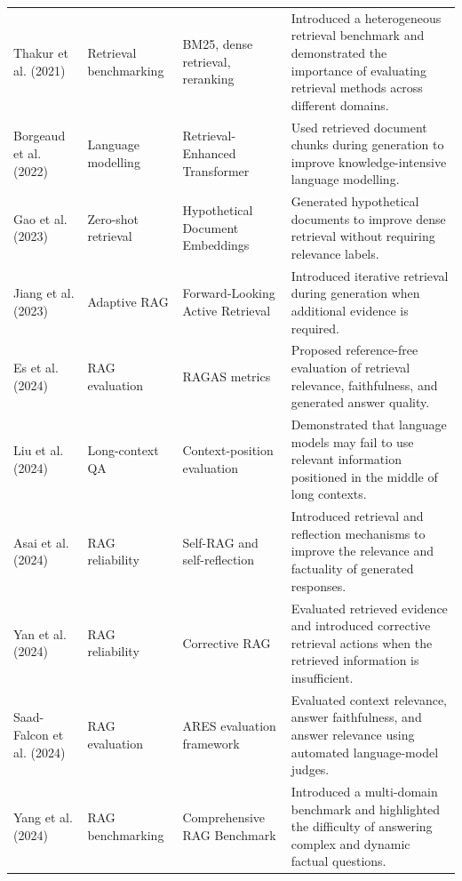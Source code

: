 \documentclass[conference]{IEEEtran}
\begin{document}
\begin{table}[!t]
\begin{tabularx}{\textwidth}{
    L{2.25cm}
    L{2.55cm}
    L{3.15cm}
    Y
}
Thakur et al. (2021) \cite{BEIR2021} &
Retrieval benchmarking &
BM25, dense retrieval, reranking &
Introduced a heterogeneous retrieval benchmark and demonstrated the importance of evaluating retrieval methods across different domains. \\

Borgeaud et al. (2022) \cite{RETRO2022} &
Language modelling &
Retrieval-Enhanced Transformer &
Used retrieved document chunks during generation to improve knowledge-intensive language modelling. \\

Gao et al. (2023) \cite{HyDE2023} &
Zero-shot retrieval &
Hypothetical Document Embeddings &
Generated hypothetical documents to improve dense retrieval without requiring relevance labels. \\

Jiang et al. (2023) \cite{FLARE2023} &
Adaptive RAG &
Forward-Looking Active Retrieval &
Introduced iterative retrieval during generation when additional evidence is required. \\

Es et al. (2024) \cite{RAGAS2023} &
RAG evaluation &
RAGAS metrics &
Proposed reference-free evaluation of retrieval relevance, faithfulness, and generated answer quality. \\

Liu et al. (2024) \cite{LostMiddle2024} &
Long-context QA &
Context-position evaluation &
Demonstrated that language models may fail to use relevant information positioned in the middle of long contexts. \\

Asai et al. (2024) \cite{SelfRAG2024} &
RAG reliability &
Self-RAG and self-reflection &
Introduced retrieval and reflection mechanisms to improve the relevance and factuality of generated responses. \\

Yan et al. (2024) \cite{CRAG2024} &
RAG reliability &
Corrective RAG &
Evaluated retrieved evidence and introduced corrective retrieval actions when the retrieved information is insufficient. \\

Saad-Falcon et al. (2024) \cite{ARES2024} &
RAG evaluation &
ARES evaluation framework &
Evaluated context relevance, answer faithfulness, and answer relevance using automated language-model judges. \\

Yang et al. (2024) \cite{CRAGBenchmark2024} &
RAG benchmarking &
Comprehensive RAG Benchmark &
Introduced a multi-domain benchmark and highlighted the difficulty of answering complex and dynamic factual questions. \\


\end{tabularx}
\end{table}
\end{document}
